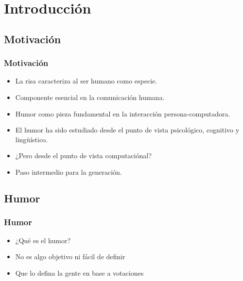 \section{Introducción} 

\subsection{Motivación}

\begin{frame}[allowframebreaks]
    \frametitle{Motivación}

    \begin{itemize}
        \item La risa caracteriza al ser humano como especie.
        \item Componente esencial en la comunicación humana.
        \item Humor como pieza fundamental en la interacción persona-computadora.
    \end{itemize}

    \framebreak
    
    \begin{itemize}
        \item El humor ha sido estudiado desde el punto de vista psicológico, cognitivo y lingüístico.
        
        \item ¿Pero desde el punto de vista computaciónal?

        \item Paso intermedio para la generación.

    \end{itemize}
\end{frame}

\subsection{Humor}

\begin{frame}
    \frametitle{Humor}

    \begin{itemize}[<+->]
        \item ¿Qué es el humor?
        \item No es algo objetivo ni fácil de definir
        \item Que lo defina la gente en base a votaciones
    \end{itemize}
\end{frame}

